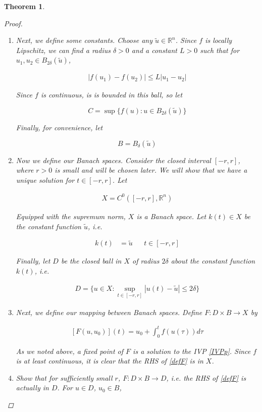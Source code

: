 \documentclass{article}
\newtheorem{theorem}{Theorem}[section]
\def\R{{\mathbb R}}
\begin{document}
\begin{theorem}
\begin{proof}
\begin{enumerate}
\item Next, we define some constants. Choose any $\tilde{u} \in \R^n$. Since $f$ is locally Lipschitz, we can find a radius $\delta > 0$ and a constant $L > 0$ such that for $u_1, u_2 \in B_{2 \delta}(\tilde{u})$,

\begin{align*}
|f(u_1) - f(u_2)| \leq L |u_1 - u_2|
\end{align*}

Since $f$ is continuous, is is bounded in this ball, so let

\[
C = \sup \{ f(u) : u \in B_{2 \delta}(\tilde{u}) \}
\]

Finally, for convenience, let

\[
B = B_\delta(\tilde{u})
\]

\item Now we define our Banach spaces. Consider the closed interval $[-r, r]$, where $r > 0$ is small and will be chosen later. We will show that we have a unique solution for $t \in [-r, r]$. Let

\begin{align*}
X = C^0([-r, r], \R^n)
\end{align*}

Equipped with the supremum norm, $X$ is a Banach space. Let $k(t) \in X$ be the constant function $\tilde{u}$, i.e.

\begin{align*}
k(t) &= \tilde{u} && t \in [-r, r]
\end{align*}

Finally, let $D$ be the closed ball in $X$ of radius $2 \delta$ about the constant function $k(t)$, i.e.

\begin{align*}
D = \{ u \in X : \sup_{t \in [-r,r]} | u(t) - \tilde{u} | \leq 2 \delta \}
\end{align*}

\item Next, we define our mapping between Banach spaces. Define $F: D \times B \rightarrow X$ by

\begin{align}\label{defF}
[F(u, u_0)](t) = u_0 + \int_0^t f(u(\tau)) d \tau
\end{align}

As we noted above, a fixed point of $F$ is a solution to the IVP \eqref{IVPp}. Since $f$ is at least continuous, it is clear that the RHS of \eqref{defF} is in $X$.

\item Show that for sufficiently small $r$, $F: D \times B \rightarrow D$, i.e. the RHS of \eqref{defF} is actually in $D$. For $u \in D$, $u_0 \in B$,


\end{enumerate}
\end{proof}
\end{theorem}
\end{document}
